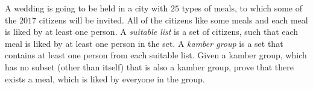 A wedding is going to be held in a city with $25$ types of meals, to which some of the $2017$ citizens will be invited. All of the citizens like some meals and each meal is liked by at least one person. A \emph{suitable list} is a set of citizens, such that each meal is liked by at least one person in the set. A \emph{kamber group} is a set that contains at least one person from each suitable list. Given a kamber group, which has no subset (other than itself) that is also a kamber group, prove that there exists a meal, which is liked by everyone in the group.
